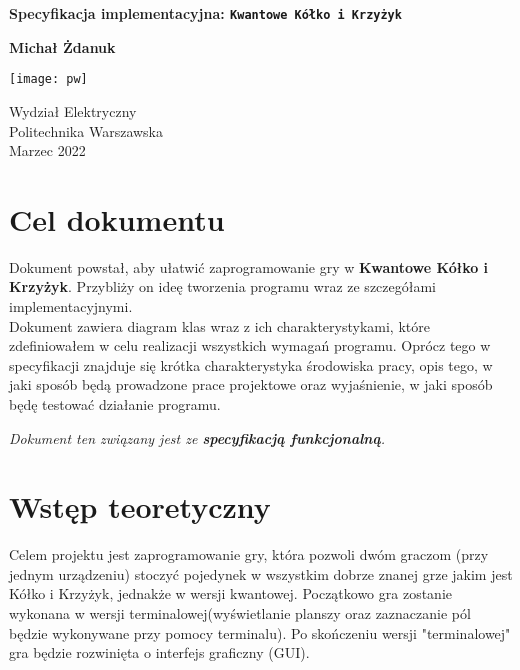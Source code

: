 \documentclass{article}
\begin{document}
\begin{titlepage}
   \begin{center}
        \vspace*{1cm}
        \Large    
        \textbf{Specyfikacja implementacyjna: \texttt{Kwantowe Kółko i Krzyżyk}}
            
        \vspace{1.5cm}

       \textbf{Michał Żdanuk}

       \vfill
            
       \vspace{0.8cm}
     
       \texttt{[image: pw]}
            
       Wydział Elektryczny\\
       Politechnika Warszawska\\
       Marzec 2022\\
       \vspace{0.8cm}
        \small

   \end{center}
   
\end{titlepage}
\newpage
\setcounter{page}{2}

\section{Cel dokumentu}
Dokument powstał, aby ułatwić zaprogramowanie gry w \textbf{Kwantowe Kółko i Krzyżyk}. Przybliży on ideę tworzenia programu wraz ze szczegółami implementacyjnymi.\\

Dokument zawiera diagram klas wraz z ich charakterystykami, które zdefiniowałem w celu realizacji wszystkich wymagań programu. Oprócz tego w specyfikacji znajduje się krótka charakterystyka środowiska pracy, opis tego, w jaki sposób będą prowadzone prace projektowe oraz wyjaśnienie, w jaki sposób będę testować działanie programu.

\begin{flushleft}\emph{Dokument ten związany jest ze \textbf{specyfikacją funkcjonalną}.}\end{flushleft}

\section{Wstęp teoretyczny}
Celem projektu jest zaprogramowanie gry, która pozwoli dwóm graczom (przy jednym urządzeniu) stoczyć pojedynek w wszystkim dobrze znanej grze jakim jest Kółko i Krzyżyk, jednakże w wersji kwantowej. Początkowo gra zostanie wykonana w wersji terminalowej(wyświetlanie planszy oraz zaznaczanie pól będzie wykonywane  przy pomocy terminalu). Po skończeniu wersji "terminalowej" gra będzie rozwinięta o interfejs graficzny (GUI).\\ 
\end{document}
